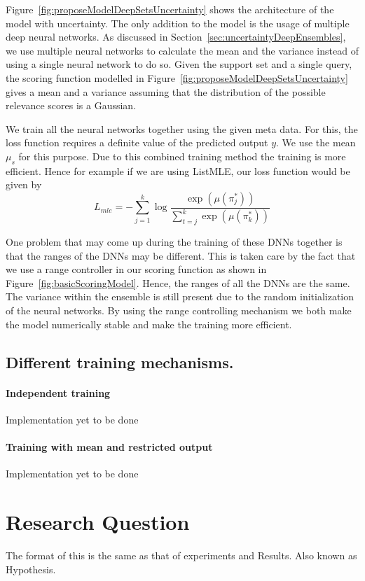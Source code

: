 \documentclass[12pt, twoside, ngerman]{report}
\begin{document}
Figure~\ref{fig:proposeModelDeepSetsUncertainty} shows the architecture of the model with uncertainty.
The only addition to the model is the usage of multiple deep neural networks.
As discussed in Section~\ref{sec:uncertaintyDeepEnsembles},  we use multiple neural networks to calculate the mean and the variance instead of using a single neural network to do so.
Given the support set and a single query,  the scoring function modelled in Figure~\ref{fig:proposeModelDeepSetsUncertainty}  gives a mean and a variance assuming that the distribution of the possible relevance scores is a Gaussian.

We train all the neural networks together using the given meta data.
For this,  the loss function requires a definite value of the predicted output $y$.
We use the mean $\mu_s$ for this purpose.
Due to this combined training method the training is more efficient.
Hence for example if we are using ListMLE,  our loss function would be given by
\begin{equation}\label{eq:overflowissue}
L_{mle} = -  \sum\limits_{j=1}^{k} \log \frac{\exp(\mu(\pi^*_j))}{ \sum\limits_{t=j}^k \exp(\mu(\pi^*_k))}
\end{equation}

One problem that may come up during the training of these DNNs together is that the ranges of the DNNs may be different.
This is taken care by the fact that we use a range controller in our scoring function as shown in Figure~\ref{fig:basicScoringModel}.
Hence, the ranges of all the DNNs are the same. 
The variance within the ensemble is still present due to the random initialization of the neural networks.
By using the range controlling mechanism we both make the model numerically stable and make the training more efficient.

\section{Different training mechanisms.}
\subsubsection{Independent training}
Implementation yet to be done

\subsubsection{Training with mean and restricted output}
Implementation yet to be done


\chapter{Research Question}
The format of this is the same as that of experiments and Results.
Also known as Hypothesis.
\end{document}
